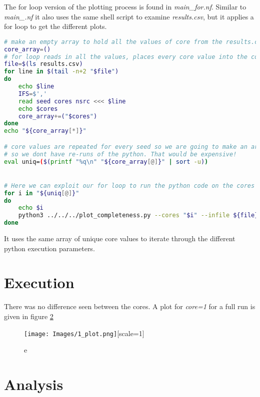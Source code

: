 \documentclass{article}
\begin{document}
    The for loop version of the plotting process is found in \textit{main\_for.nf}. Similar to \textit{main\_.nf} it also uses the same shell script to 
    examine \textit{results.csv}, but it applies a for loop to get the different plots.
    
\begin{lstlisting}[language=bash, label=main_forscript.nf]
# make an empty array to hold all the values of core from the results.csv
core_array=()
# for loop reads in all the values, places every core value into the core_array
file=$(ls results.csv)
for line in $(tail -n+2 "$file")
do
	echo $line
	IFS=$','
	read seed cores nsrc <<< $line
	echo $cores
	core_array+=("$cores")
done
echo "${core_array[*]}"

# core values are repeated for every seed so we are going to make an array of only unique core values,
# so we dont have re-runs of the python. That would be expensive!
eval uniq=($(printf "%q\n" "${core_array[@]}" | sort -u))


# Here we can exploit our for loop to run the python code on the cores we want.
for i in "${uniq[@]}"
do
	echo $i
	python3 ../../../plot_completeness.py --cores "$i" --infile ${file} --outfile "${i}_plot.png"
done
\end{lstlisting}
    
    It uses the same array of unique core values to iterate through the different python execution parameters.
    
    \section{Execution}
    
    There was no difference seen between the cores. A plot for \textit{core=1} for a full run is given in figure \ref{}
    
    \begin{figure}
    	\centering
    	\texttt{[image: Images/1\_plot.png]}[scale=1]
    	\label{e}
    	\caption{e}
    \end{figure}
    
    
    \section{Analysis}

	
\end{document}
